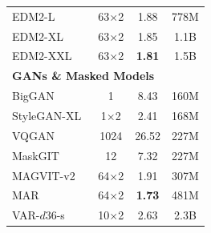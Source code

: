 \begin{table}[t]
\begin{minipage}{0.48\textwidth}
{\begin{tabular}{lccc}
EDM2-L~\citep{karras2024edm2} & 63$\times$2 & 1.88 & 778M \\
EDM2-XL~\citep{karras2024edm2} & 63$\times$2 & 1.85 & 1.1B \\
EDM2-XXL~\citep{karras2024edm2} & 63$\times$2 & \textbf{1.81} & 1.5B \\
\midrule
\multicolumn{4}{l}{\textbf{GANs \& Masked Models}} \\
\midrule
BigGAN~\citep{brock2018biggan} & 1 & 8.43 & 160M \\
StyleGAN-XL~\citep{sauer2022stylegan-xl} & 1$\times$2 & 2.41 & 168M \\
VQGAN~\citep{esser2021VQGAN} & 1024 & 26.52 & 227M \\
MaskGIT~\citep{chang2022maskgit} & 12 & 7.32 & 227M \\
MAGVIT-v2~\citep{yu2023language} & 64$\times$2 & 1.91 & 307M \\
MAR~\citep{li2024MAR} & 64$\times$2 & \textbf{1.73} & 481M \\
VAR-$d$36-s~\citep{tian2024VAR} & 10$\times$2 & 2.63 & 2.3B \\
\bottomrule
\end{tabular}
}
\end{minipage}
\begin{minipage}{0.48\textwidth}
\end{minipage}
\end{table}
